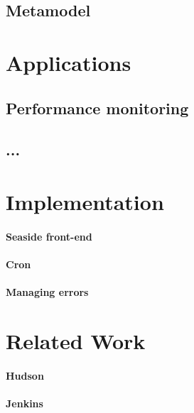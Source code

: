 \documentclass[runningheads]{llncs}
\newcommand{\seclabel}[1]{\label{sec:#1}}
\begin{document}
\subsection{Metamodel} \seclabel{metamodel}


\section{Applications} \seclabel{applications}

\subsection{Performance monitoring}

\subsection{...}


\section{Implementation} \seclabel{implementation}

\paragraph{Seaside front-end}

\paragraph{Cron}

\paragraph{Managing errors}

\section{Related Work} \seclabel{relatedwork}

\paragraph{Hudson}

\paragraph{Jenkins}
\end{document}
